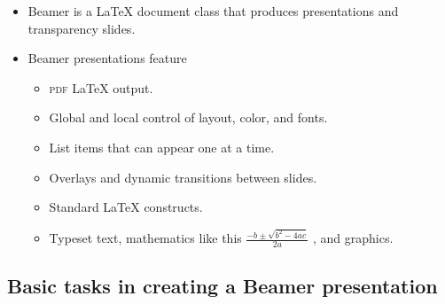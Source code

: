 \documentclass[notes=show,beamer]{beamer}
\begin{document}
\begin{frame}%


\begin{itemize}
\item Beamer is a 
\LaTeX{}
document class that produces presentations and transparency slides.

\item Beamer presentations feature

\begin{itemize}
\item \textsc{pdf}%
\LaTeX{}
output.

\item Global and local control of layout, color, and fonts.

\item List items that can appear one at a time.

\item Overlays and dynamic transitions between slides.

\item Standard 
\LaTeX{}
constructs.

\item Typeset text, mathematics like this $\frac{-b\pm \sqrt{b^{2}-4ac}}{2a}$%
, and graphics.
\end{itemize}
\end{itemize}


\transboxout%
\end{frame}%

\subsection{Basic tasks in creating a Beamer presentation}
\end{document}
